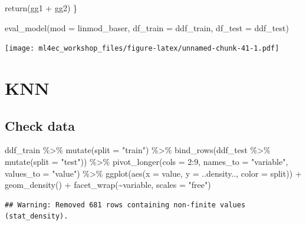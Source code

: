 \documentclass[
]{book}
\newenvironment{Shaded}{\begin{snugshade}}{\end{snugshade}}
\newcommand{\AttributeTok}[1]{\textcolor[rgb]{0.77,0.63,0.00}{#1}}
\newcommand{\DecValTok}[1]{\textcolor[rgb]{0.00,0.00,0.81}{#1}}
\newcommand{\FunctionTok}[1]{\textcolor[rgb]{0.00,0.00,0.00}{#1}}
\newcommand{\NormalTok}[1]{#1}
\newcommand{\SpecialCharTok}[1]{\textcolor[rgb]{0.00,0.00,0.00}{#1}}
\newcommand{\StringTok}[1]{\textcolor[rgb]{0.31,0.60,0.02}{#1}}
\begin{document}
\begin{Shaded}
\begin{Highlighting}[]
  \FunctionTok{return}\NormalTok{(gg1 }\SpecialCharTok{+}\NormalTok{ gg2)}
\NormalTok{\}}

\FunctionTok{eval\_model}\NormalTok{(}\AttributeTok{mod =}\NormalTok{ linmod\_baser, }\AttributeTok{df\_train =}\NormalTok{ ddf\_train, }\AttributeTok{df\_test =}\NormalTok{ ddf\_test)}
\end{Highlighting}
\end{Shaded}

\texttt{[image: ml4ec\_workshop\_files/figure-latex/unnamed-chunk-41-1.pdf]}

\hypertarget{knn-1}{%
\section{KNN}\label{knn-1}}

\hypertarget{check-data-1}{%
\subsection{Check data}\label{check-data-1}}

\begin{Shaded}
\begin{Highlighting}[]
\NormalTok{ddf\_train }\SpecialCharTok{\%\textgreater{}\%} 
  \FunctionTok{mutate}\NormalTok{(}\AttributeTok{split =} \StringTok{"train"}\NormalTok{) }\SpecialCharTok{\%\textgreater{}\%} 
  \FunctionTok{bind\_rows}\NormalTok{(ddf\_test }\SpecialCharTok{\%\textgreater{}\%} 
    \FunctionTok{mutate}\NormalTok{(}\AttributeTok{split =} \StringTok{"test"}\NormalTok{)) }\SpecialCharTok{\%\textgreater{}\%} 
  \FunctionTok{pivot\_longer}\NormalTok{(}\AttributeTok{cols =} \DecValTok{2}\SpecialCharTok{:}\DecValTok{9}\NormalTok{, }\AttributeTok{names\_to =} \StringTok{"variable"}\NormalTok{, }\AttributeTok{values\_to =} \StringTok{"value"}\NormalTok{) }\SpecialCharTok{\%\textgreater{}\%} 
  \FunctionTok{ggplot}\NormalTok{(}\FunctionTok{aes}\NormalTok{(}\AttributeTok{x =}\NormalTok{ value, }\AttributeTok{y =}\NormalTok{ ..density.., }\AttributeTok{color =}\NormalTok{ split)) }\SpecialCharTok{+}
  \FunctionTok{geom\_density}\NormalTok{() }\SpecialCharTok{+}
  \FunctionTok{facet\_wrap}\NormalTok{(}\SpecialCharTok{\textasciitilde{}}\NormalTok{variable, }\AttributeTok{scales =} \StringTok{"free"}\NormalTok{)}
\end{Highlighting}
\end{Shaded}

\begin{verbatim}
## Warning: Removed 681 rows containing non-finite values (stat_density).
\end{verbatim}
\end{document}
